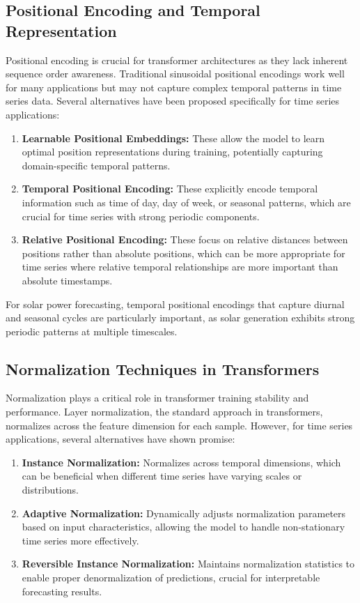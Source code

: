 \documentclass[12pt]{uomthesis}
\begin{document}
\subsection{Positional Encoding and Temporal Representation}

Positional encoding is crucial for transformer architectures as they lack inherent sequence order awareness. Traditional sinusoidal positional encodings work well for many applications but may not capture complex temporal patterns in time series data. Several alternatives have been proposed specifically for time series applications:

\begin{enumerate}
\item \textbf{Learnable Positional Embeddings:} These allow the model to learn optimal position representations during training, potentially capturing domain-specific temporal patterns.

\item \textbf{Temporal Positional Encoding:} These explicitly encode temporal information such as time of day, day of week, or seasonal patterns, which are crucial for time series with strong periodic components.

\item \textbf{Relative Positional Encoding:} These focus on relative distances between positions rather than absolute positions, which can be more appropriate for time series where relative temporal relationships are more important than absolute timestamps.
\end{enumerate}

For solar power forecasting, temporal positional encodings that capture diurnal and seasonal cycles are particularly important, as solar generation exhibits strong periodic patterns at multiple timescales.

\subsection{Normalization Techniques in Transformers}

Normalization plays a critical role in transformer training stability and performance. Layer normalization, the standard approach in transformers, normalizes across the feature dimension for each sample. However, for time series applications, several alternatives have shown promise:

\begin{enumerate}
\item \textbf{Instance Normalization:} Normalizes across temporal dimensions, which can be beneficial when different time series have varying scales or distributions.

\item \textbf{Adaptive Normalization:} Dynamically adjusts normalization parameters based on input characteristics, allowing the model to handle non-stationary time series more effectively.

\item \textbf{Reversible Instance Normalization:} Maintains normalization statistics to enable proper denormalization of predictions, crucial for interpretable forecasting results.
\end{enumerate}
\end{document}
